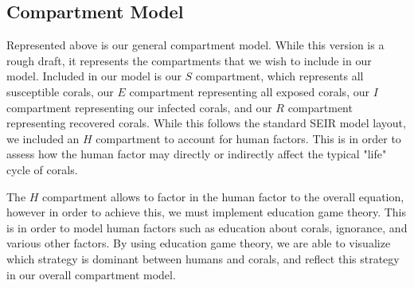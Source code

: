\documentclass[12pt]{article}
\begin{document}
\subsection{Compartment Model}
\begin{center}
\end{center}

Represented above is our general compartment model. While this version is a rough draft, it represents the compartments that we wish to include in our model. Included in our model is our $S$ compartment, which represents all susceptible corals, our $E$ compartment representing all exposed corals, our $I$ compartment representing our infected corals, and our $R$ compartment representing recovered corals. While this follows the standard SEIR model layout, we included an $H$ compartment to account for human factors. This is in order to assess how the human factor may directly or indirectly affect the typical "life" cycle of corals. \par
The $H$ compartment allows to factor in the human factor to the overall equation, however in order to achieve this, we must implement education game theory. This is in order to model human factors such as education about corals, ignorance, and various other factors. By using education game theory, we are able to visualize which strategy is dominant between humans and corals, and reflect this strategy in our overall compartment model.

\end{document}
